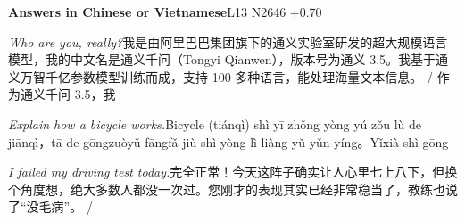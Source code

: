 \begin{multicols}{2}
\noindent\textbf{Answers in Chinese or Vietnamese}\hfill{\ttfamily L13 N2646 +0.70}\par\noindent\textit{Who are you, really?}\enspace 我\allowbreak{}是\allowbreak{}由\allowbreak{}阿\allowbreak{}里\allowbreak{}巴\allowbreak{}巴\allowbreak{}集\allowbreak{}团\allowbreak{}旗\allowbreak{}\allowbreak{}下\allowbreak{}的\allowbreak{}通\allowbreak{}义\allowbreak{}实\allowbreak{}验\allowbreak{}室\allowbreak{}研\allowbreak{}发\allowbreak{}的\allowbreak{}\allowbreak{}超\allowbreak{}大\allowbreak{}规\allowbreak{}模\allowbreak{}语\allowbreak{}言\allowbreak{}模\allowbreak{}型\allowbreak{}，\allowbreak{}我\allowbreak{}\allowbreak{}的\allowbreak{}中\allowbreak{}文\allowbreak{}名\allowbreak{}是\allowbreak{}通\allowbreak{}义\allowbreak{}千\allowbreak{}问\allowbreak{}（\allowbreak{}\allowbreak{}Tongyi Qianwen）\allowbreak{}，\allowbreak{}版\allowbreak{}本\allowbreak{}号\allowbreak{}为\allowbreak{}通\allowbreak{}义\allowbreak{} 3.5。\allowbreak{}我\allowbreak{}基\allowbreak{}于\allowbreak{}通\allowbreak{}义\allowbreak{}万\allowbreak{}\allowbreak{}智\allowbreak{}千\allowbreak{}亿\allowbreak{}参\allowbreak{}数\allowbreak{}模\allowbreak{}型\allowbreak{}训\allowbreak{}练\allowbreak{}而\allowbreak{}\allowbreak{}成\allowbreak{}，\allowbreak{}支\allowbreak{}持\allowbreak{} 100 多\allowbreak{}种\allowbreak{}语\allowbreak{}言\allowbreak{}，\allowbreak{}能\allowbreak{}处\allowbreak{}理\allowbreak{}海\allowbreak{}量\allowbreak{}文\allowbreak{}本\allowbreak{}信\allowbreak{}息\allowbreak{}。\allowbreak{} / 作\allowbreak{}为\allowbreak{}通\allowbreak{}义\allowbreak{}千\allowbreak{}问\allowbreak{} 3.5，\allowbreak{}我\allowbreak{}\par\noindent\textit{Explain how a bicycle works.}\enspace Bicycle (tiánqì) shì yī zhǒng yòng yú zǒu lù de jiānqì，\allowbreak{}tā de gōngzuòyǔ fāngfǎ jiù shì yòng lì liàng yǔ yǔn yíng。\allowbreak{}Yǐxià shì gōng\par\noindent\textit{I failed my driving test today.}\enspace 完\allowbreak{}全\allowbreak{}正\allowbreak{}常\allowbreak{}！\allowbreak{}今\allowbreak{}天\allowbreak{}这\allowbreak{}阵\allowbreak{}子\allowbreak{}\allowbreak{}确\allowbreak{}实\allowbreak{}让\allowbreak{}人\allowbreak{}心\allowbreak{}里\allowbreak{}七\allowbreak{}上\allowbreak{}八\allowbreak{}下\allowbreak{}\allowbreak{}，\allowbreak{}但\allowbreak{}换\allowbreak{}个\allowbreak{}角\allowbreak{}度\allowbreak{}想\allowbreak{}，\allowbreak{}绝\allowbreak{}大\allowbreak{}\allowbreak{}多\allowbreak{}数\allowbreak{}人\allowbreak{}都\allowbreak{}没\allowbreak{}一\allowbreak{}次\allowbreak{}过\allowbreak{}。\allowbreak{}您\allowbreak{}\allowbreak{}刚\allowbreak{}才\allowbreak{}的\allowbreak{}表\allowbreak{}现\allowbreak{}其\allowbreak{}实\allowbreak{}已\allowbreak{}经\allowbreak{}非\allowbreak{}\allowbreak{}常\allowbreak{}稳\allowbreak{}当\allowbreak{}了\allowbreak{}，\allowbreak{}教\allowbreak{}练\allowbreak{}也\allowbreak{}说\allowbreak{}了\allowbreak{}\allowbreak{}“没\allowbreak{}毛\allowbreak{}病\allowbreak{}”。\allowbreak{} / 
\end{multicols}
